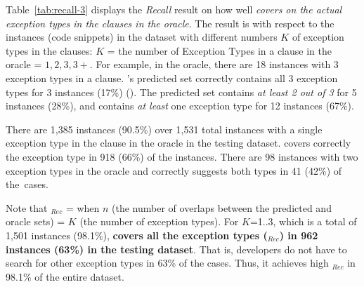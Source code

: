 Table~\ref{tab:recall-3} displays the {\em Recall} result on how well
{\em {\tool} covers on the actual exception types in the 
  clauses in the oracle}. The result is with respect to the instances
(code snippets) in the dataset with different numbers $K$ of exception
types in the  clauses: $K$ = the number of Exception Types
in a  clause in the oracle = $1,2,3,3+$. For example, in the
oracle, there are 18 instances with 3 exception types in a
 clause. {\tool}'s predicted set correctly contains all 3
exception types for 3 instances (17\%) (). The
predicted set contains {\em at least 2 out of 3} for 5 instances
(28\%), and contains {\em at least} one exception type for 12 instances
(67\%).




There are 1,385 instances (90.5\%) over 1,531 total instances with a
single exception type in the  clause in the
oracle in the testing dataset. {\tool} covers correctly the exception type in 918
(66\%) of the instances. There are 98 instances with two exception
types in the oracle and {\tool} correctly suggests both types in
41 (42\%) of the~cases.


Note that $_{Rec}$ =  when $n$ (the number
of overlaps between the predicted and oracle sets) = $K$ (the number
of exception types). For $K$=1..3, which is a total of 1,501
instances (98.1\%), {\bf {\tool} covers all the exception types
  ($_{Rec}$) in 962 instances (63\%) in the testing dataset}. That is,
developers do not have to search for other exception types in 63\% of
the cases. Thus, it achieves high $_{Rec}$ in 98.1\% of
  the entire dataset.

